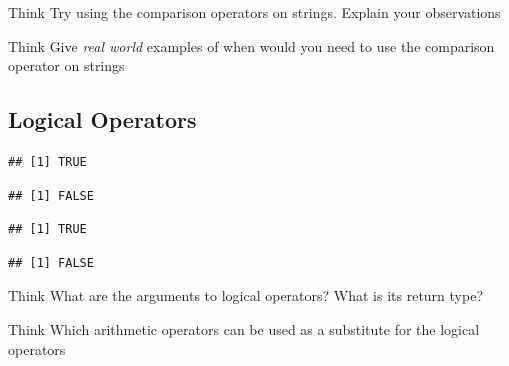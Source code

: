 \documentclass[12pt]{book}\usepackage{knitr}
\begin{document}
\begin{DIY}{Think}
Try using the comparison operators on strings. Explain your observations
\end{DIY}

\begin{DIY}{Think}
Give \emph{real world} examples of when would you need to use the comparison operator on strings
\end{DIY}

\subsection{Logical Operators}
\begin{knitrout}
\color{fgcolor}\begin{kframe}
\begin{alltt}
\hlstd{(} \hlopt{>} \hlstd{)} \hlopt{&} \hlstd{(} \hlopt{>=} \hlstd{)} 
\end{alltt}
\begin{verbatim}
## [1] TRUE
\end{verbatim}
\begin{alltt}
\hlstd{(} \hlopt{>} \hlstd{)} \hlopt{&} \hlstd{(} \hlopt{<} \hlstd{)}
\end{alltt}
\begin{verbatim}
## [1] FALSE
\end{verbatim}
\begin{alltt}
\hlstd{(} \hlopt{>} \hlstd{)} \hlopt{|} \hlstd{(} \hlopt{<} \hlstd{)} 
\end{alltt}
\begin{verbatim}
## [1] TRUE
\end{verbatim}
\begin{alltt}
\hlopt{!}\hlstd{(} \hlopt{>} \hlstd{)} 
\end{alltt}
\begin{verbatim}
## [1] FALSE
\end{verbatim}
\end{kframe}
\end{knitrout}
\begin{DIY}{Think}
What are the arguments to logical operators? What is its return type? 
\end{DIY}

\begin{DIY}{Think}
Which arithmetic operators can be used as a substitute for the logical operators
\end{DIY}
\end{document}
